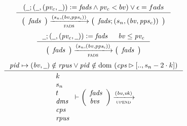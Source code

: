 \begin{figure}[htb]
  \begin{equation}
    \label{eq:rule:fads-add}
    \inference
    {
      (\wcard ; (\wcard, (\var{pv_c}, \wcard)) \leteq \var{fads}
      \wedge \var{pv_c} < bv) \vee \epsilon = fads
    }
    {
      {
        \left(
          \begin{array}{l}
            \var{fads}
          \end{array}
        \right)
      }
      \trans{fads}{(s_n, (\var{bv}, \var{pps_c}))}
      {
        \left(
          \begin{array}{l}
            \var{fads}; (s_n, (\var{bv}, \var{pps_c}))
          \end{array}
        \right)
      }
    }
  \end{equation}
  \nextdef
  \begin{equation}
    \label{eq:rule:fads-noop}
    \inference
    {
      \wcard ; (\wcard, (\var{pv_c}, \wcard)) \leteq \var{fads} & \var{bv} \leq \var{pv_c}
    }
    {
      {
        \left(
          \begin{array}{l}
            \var{fads}
          \end{array}
        \right)
      }
      \trans{fads}{(s_n, (\var{bv}, \var{pps_c}))}
      {
        \left(
          \begin{array}{l}
            \var{fads}
          \end{array}
        \right)
      }
    }
  \end{equation}
  \nextdef
    \begin{equation}
    \label{eq:rule:up-up-invalid}
    \inference
    {
      \var{pid} \mapsto (\var{bv}, \wcard) \notin \var{rpus}
      \vee \var{pid} \notin \dom~(\var{cps} \restrictrange [.., s_n - 2 \cdot k])
    }
    {
      {
        \begin{array}{l}
          k\\
          s_n\\
          t\\
          \var{dms}\\
          \var{cps}\\
          \var{rpus}
        \end{array}
      }
      \vdash
      {
        \left(
          \begin{array}{l}
            \var{fads}\\
            \var{bvs}
          \end{array}
        \right)
      }
      \trans{upend}{(\var{bv}, \var{vk})}
}
\end{equation}
\end{figure}
